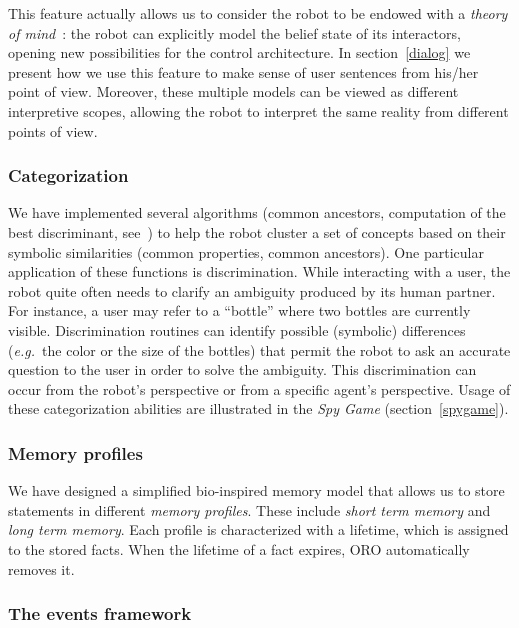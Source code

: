 \documentclass[twocolumn]{svjour3}
\newcommand{\eg}{{\textit{e.g.~}}}
\begin{document}
This feature actually allows us to consider the robot to be endowed with a
\emph{theory of mind}~\cite{Scassellati2002}: the robot can explicitly model
the belief state of its interactors, opening new possibilities for the control
architecture. In section~\ref{dialog} we present how we use this feature to
make sense of user sentences from his/her point of view. Moreover,
these multiple models can be viewed as different interpretive scopes,
allowing the robot to interpret the same reality from different points of view.

\subsubsection{Categorization}
\label{categorization}

We have implemented several algorithms (common ancestors, computation of the
best discriminant, see~\cite{Ros2010b}) to help the robot cluster a set of
concepts based on their symbolic similarities (common properties, common
ancestors). One particular application of these functions is discrimination.
While interacting with a user, the robot quite often needs to clarify an
ambiguity produced by its human partner. For instance, a user may refer to a
``bottle'' where two bottles are currently visible. Discrimination routines
can identify possible (symbolic) differences (\eg the color or the size of the
bottles) that permit the robot to ask an accurate question to the user in order
to solve the ambiguity. This discrimination can occur from the robot's
perspective or from a specific agent's perspective. Usage of these
categorization abilities are illustrated in the \emph{Spy Game}
(section~\ref{spygame}).

\subsubsection{Memory profiles}
\label{memory}

We have designed a simplified bio-inspired memory model that allows us to store
statements in different \emph{memory profiles}. These include \emph{short term
memory} and \emph{long term memory}. Each profile is characterized with a
lifetime, which is assigned to the stored facts. When the lifetime of a fact
expires, ORO automatically removes it.

\subsubsection{The events framework} 
\label{events} 
\end{document}
